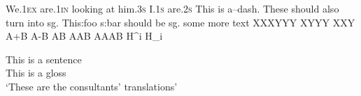 \documentclass{article}
\newcommand{\mygloss}[1]{.\textsc{#1}}
\begin{document}
We\mygloss{1ex} are\mygloss{1in} looking at him\mygloss{3s}
I\mygloss{1s} are\mygloss{2s}
This is a{--}dash.
The{s}e {s}hould al{s}o turn into sg.
Thi{s:foo} {s:bar} should be sg.
 some more text
XXXYYY XYYY XXY
A+B
A-B
AB AAB AAAB
H^{i}
H_{i}
\begin{exe}
\ex \gll This is a sentence\\
         This is a gloss\\
    \glt `These are the consultants' translations'
\end{exe}
\end{document}
